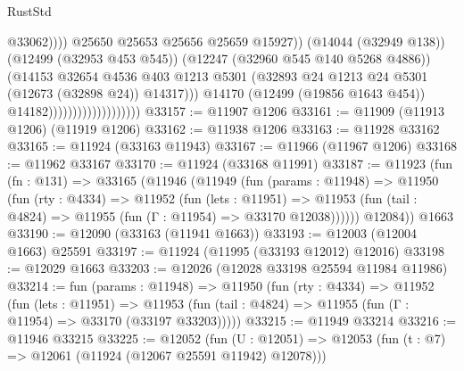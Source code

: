 \begin{lexlean}{RustStd}
\begin{coremodule}
{\begin{coremodule}
{{{{{{{{{{{{{{{{{{{{{{{{{{{{{{{{{{{{{{{{{{{{{{{{{{{{{{{{{{{{{{{{{{{{{{{{{{{{{{{{                                                        @33062))))
                                                @25650
                                                @25653
                                                @25656
                                                @25659
                                                @15927))
                                            (@14044 (@32949 @138))
                                            (@12499 (@32953 @453 @545))
                                            (@12247 (@32960 @545 @140 @5268 @4886))
                                            (@14153
                                              @32654
                                              @4536
                                              @403
                                              @1213
                                              @5301
                                              (@32893
                                                @24
                                                @1213
                                                @24
                                                @5301
                                                (@12673 (@32898 @24))
                                                @14317)))
                                          @14170
                                          (@12499 (@19856 @1643 @454))
                                          @14182)))))))))))))))))))
@33157 := @11907 @1206
@33161 := @11909 (@11913 @1206) (@11919 @1206)
@33162 := @11938 @1206
@33163 := @11928 @33162
@33165 := @11924 (@33163 @11943)
@33167 := @11966 (@11967 @1206)
@33168 := @11962 @33167
@33170 := @11924 (@33168 @11991)
@33187 := @11923
    (fun (fn : @131) =>
    @33165
      (@11946
        (@11949
          (fun (params : @11948) =>
          @11950
            (fun (rty : @4334) =>
            @11952
              (fun (lets : @11951) =>
              @11953 (fun (tail : @4824) => @11955 (fun (Γ : @11954) => @33170 @12038))))))
        @12084))
    @1663
@33190 := @12090 (@33163 (@11941 @1663))
@33193 := @12003 (@12004 @1663) @25591
@33197 := @11924 (@11995 (@33193 @12012) @12016)
@33198 := @12029 @1663
@33203 := @12026 (@12028 @33198 @25594 @11984 @11986)
@33214 := fun (params : @11948) =>
  @11950
    (fun (rty : @4334) =>
    @11952
      (fun (lets : @11951) =>
      @11953 (fun (tail : @4824) => @11955 (fun (Γ : @11954) => @33170 (@33197 @33203)))))
@33215 := @11949 @33214
@33216 := @11946 @33215
@33225 := @12052
    (fun (U : @12051) => @12053 (fun (t : @7) => @12061 (@11924 (@12067 @25591 @11942) @12078)))
}}}}}}}}}}}}}}}}}}}}}}}}}}}}}}}}}}}}}}}}}}}}}}}}}}}}}}}}}}}}}}}}}}}}}}}}}}}}}}}}
\end{coremodule}}
\end{coremodule}
\end{lexlean}
